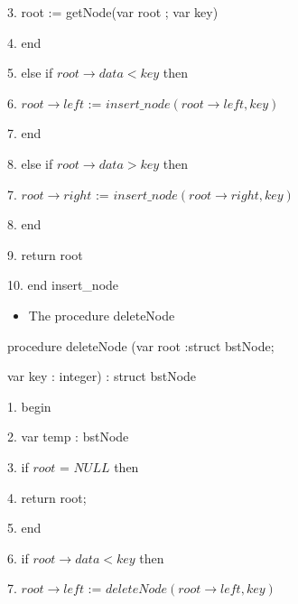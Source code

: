 \documentclass{article}
\begin{document}
3.\hspace{50pt} root := getNode(var root ; var key)

4.\hspace{40pt} end

5.\hspace{40pt} else if $root\rightarrow data < key$ \hspace{5pt} then

6.\hspace{50pt} $root\rightarrow left$ := $insert\_node(root\rightarrow left, key)$

7.\hspace{40pt} end

8.\hspace{40pt} else if $root\rightarrow data > key$ \hspace{5pt} then

7.\hspace{50pt} $root\rightarrow right$ := $insert\_node(root\rightarrow right, key)$

8.\hspace{40pt} end

9.\hspace{40pt} return root

10.\hspace{30pt} end insert\_node
\begin{itemize}
    \item The procedure deleteNode
\end{itemize}

procedure deleteNode (var root :struct bstNode; 

\indent  \indent   \indent    \indent  \indent   \indent  \indent
  var key : integer) : struct bstNode
  
1.\hspace{30pt} begin

2.\hspace{40pt} var temp : bstNode

3.\hspace{40pt} if $root$ = $NULL$ \hspace{5pt} then

4.\hspace{50pt} return root;

5.\hspace{40pt} end

6.\hspace{40pt} if $root\rightarrow data < key$ \hspace{5pt} then

7.\hspace{50pt} $root\rightarrow left$ := $deleteNode(root\rightarrow left, key)$
\end{document}
